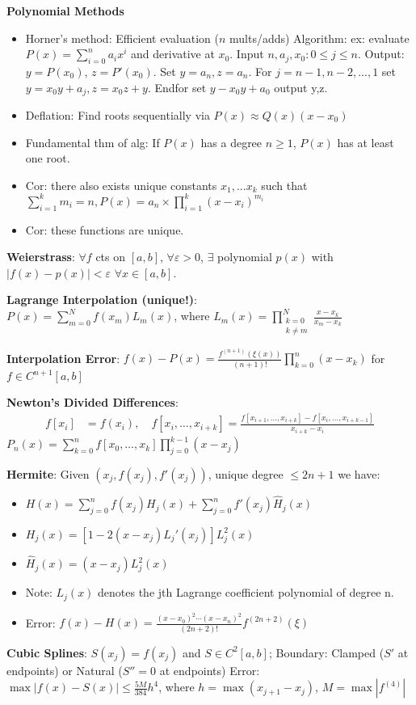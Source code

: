 \documentclass{article}
\begin{document}
\begin{minipage}[t]{0.49\textwidth}
\textbf{Polynomial Methods}
\begin{itemize}
  \item Horner's method: Efficient evaluation ($n$ mults/adds) Algorithm: ex: evaluate $P(x)=\sum^{n}_{i=0}a_ix^i$ and derivative at $x_0$. Input $n,a_j, x_0: 0\le j\le n$. Output: $y=P(x_0)$, $z=P'(x_0)$. Set $y=a_n, z=a_n$. For $j=n-1,n-2,...,1$ set $y=x_0y+a_j,z=x_0z+y$. Endfor set $y-x_0y+a_0$ output y,z.  
    \item Deflation: Find roots sequentially via $P(x)\approx Q(x)(x-x_0)$
    \item Fundamental thm of alg: If $P(x)$ has a degree $n\ge 1$, $P(x)$ has at least one root.
    \item Cor: there also exists unique constants $x_1, ... x_k$ such that\\
    $\sum_{i=1}^{k}m_i=n, P(x)=a_n \times \prod_{i=1}^{k}(x-x_i)^{m_i}$
    \item Cor: these functions are unique.
\end{itemize}
\textbf{Weierstrass}: $\forall f$ cts on $[a,b]$, $\forall \varepsilon>0$, $\exists$ polynomial $p(x)$ with $|f(x)-p(x)|<\varepsilon$ $\forall x \in [a,b]$.

  \textbf{Lagrange Interpolation (unique!)}:\\ $P(x) = \sum_{m=0}^N f(x_m) L_m(x)$, where $L_m(x) = \prod_{\substack{k=0\\k\neq m}}^N \frac{x-x_k}{x_m-x_k}$

\textbf{Interpolation Error}: $f(x)-P(x) = \frac{f^{(n+1)}(\xi(x))}{(n+1)!} \prod_{k=0}^n (x-x_k)$ for $f\in C^{n+1}[a,b]$

\textbf{Newton's Divided Differences}:
\begin{align*}
f[x_i] &= f(x_i),\quad f[x_i,\dots,x_{i+k}] = \frac{f[x_{i+1},\dots,x_{i+k}] - f[x_i,\dots,x_{i+k-1}]}{x_{i+k}-x_i}
\end{align*}
$P_n(x) = \sum_{k=0}^n f[x_0,\dots,x_k] \prod_{j=0}^{k-1} (x-x_j)$

\textbf{Hermite}: Given $(x_j, f(x_j), f'(x_j))$, unique degree $\leq 2n+1$ we have:
  \begin{itemize}
\item $H(x) = \sum_{j=0}^n f(x_j)H_j(x) + \sum_{j=0}^n f'(x_j)\hat{H}_j(x)$
    \item $H_j(x)=[1-2(x-x_j)L_j'(x_j)]L_j^2(x)$
    \item $\hat{H}_j(x)=(x-x_j)L_j^2(x)$
    \item Note: $L_j(x)$ denotes the jth Lagrange coefficient polynomial of degree n. 
\item Error: $f(x)-H(x) = \frac{(x-x_0)^2\cdots(x-x_n)^2}{(2n+2)!}f^{(2n+2)}(\xi)$
  \end{itemize}
\textbf{Cubic Splines}: $S(x_j)=f(x_j)$ and $S \in C^2[a,b]$; Boundary: Clamped ($S'$ at endpoints) or Natural ($S''=0$ at endpoints)
Error: $\max|f(x)-S(x)| \leq \frac{5M}{384}h^4$, where $h=\max(x_{j+1}-x_j)$, $M=\max|f^{(4)}|$


\end{minipage}
\end{document}
